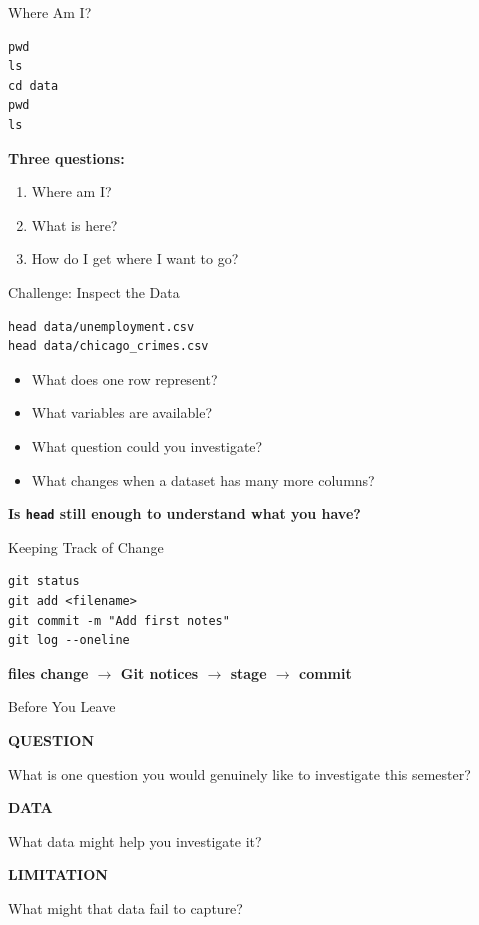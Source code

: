 \documentclass[aspectratio=169]{beamer}
\newcommand{\redrule}{\par\vspace{0.15cm}{\color{LangRed}\rule{\linewidth}{1.5pt}}}
\begin{document}
\begin{frame}[fragile]{Where Am I?}
\redrule
\vspace{0.25cm}
\begin{lstlisting}[style=terminal]
pwd
ls
cd data
pwd
ls
\end{lstlisting}
\vspace{0.25cm}
{\Large\bfseries Three questions:}
\begin{enumerate}
  \item Where am I?
  \item What is here?
  \item How do I get where I want to go?
\end{enumerate}
\end{frame}

\begin{frame}[fragile]{Challenge: Inspect the Data}
\redrule
\begin{lstlisting}[style=terminal]
head data/unemployment.csv
head data/chicago_crimes.csv
\end{lstlisting}
\begin{itemize}
  \item What does one row represent?
  \item What variables are available?
  \item What question could you investigate?
  \item What changes when a dataset has many more columns?
\end{itemize}
\vfill
{\Large\bfseries Is \texttt{head} still enough to understand what you have?}
\end{frame}

\begin{frame}[fragile]{Keeping Track of Change}
\redrule
\begin{lstlisting}[style=terminal]
git status
git add <filename>
git commit -m "Add first notes"
git log --oneline
\end{lstlisting}
\vspace{0.3cm}
\begin{center}
{\Large\bfseries files change $\longrightarrow$ Git notices $\longrightarrow$ stage $\longrightarrow$ commit}
\end{center}
\end{frame}

\begin{frame}{Before You Leave}
\redrule
\vspace{0.3cm}
{\color{LangRed}\bfseries QUESTION}\par
What is one question you would genuinely like to investigate this semester?

\vspace{0.55cm}
{\color{LangRed}\bfseries DATA}\par
What data might help you investigate it?

\vspace{0.55cm}
{\color{LangRed}\bfseries LIMITATION}\par
What might that data fail to capture?
\end{frame}
\end{document}
